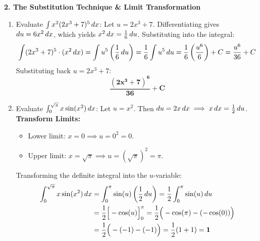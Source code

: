 \textbf{2. The Substitution Technique \& Limit Transformation}
\begin{enumerate}
    \item Evaluate $\int x^2 (2x^3 + 7)^5 \,dx$:
    Let $u = 2x^3 + 7$. Differentiating gives $du = 6x^2 \,dx$, which yields $x^2 \,dx = \frac{1}{6} \, du$.
    Substituting into the integral:
    \begin{equation*}
    \int (2x^3 + 7)^5 \cdot (x^2 \,dx) = \int u^5 \left(\frac{1}{6} \, du\right) = \frac{1}{6} \int u^5 \, du = \frac{1}{6} \left(\frac{u^6}{6}\right) + C = \frac{u^6}{36} + C
    \end{equation*}
    Substituting back $u = 2x^3 + 7$:
    \begin{equation*}
    \mathbf{\frac{(2x^3 + 7)^6}{36} + C}
    \end{equation*}

    \item Evaluate $\int_0^{\sqrt{\pi}} x \sin(x^2) \,dx$:
    Let $u = x^2$. Then $du = 2x \,dx \implies x \,dx = \frac{1}{2} \, du$.
    \textbf{Transform Limits:}
    \begin{itemize}
        \item Lower limit: $x = 0 \implies u = 0^2 = 0$.
        \item Upper limit: $x = \sqrt{\pi} \implies u = (\sqrt{\pi})^2 = \pi$.
    \end{itemize}
    Transforming the definite integral into the $u$-variable:
    \begin{align*}
    \int_0^{\sqrt{\pi}} x \sin(x^2) \,dx &= \int_0^\pi \sin(u) \left(\frac{1}{2} \, du\right) = \frac{1}{2} \int_0^\pi \sin(u) \, du \\
    &= \frac{1}{2} \Big[ -\cos(u) \Big]_0^\pi = \frac{1}{2} \Big( -\cos(\pi) - (-\cos(0)) \Big) \\
    &= \frac{1}{2} \Big( -(-1) - (-1) \Big) = \frac{1}{2} (1 + 1) = \mathbf{1}
    \end{align*}
\end{enumerate}


